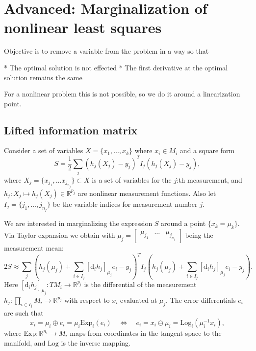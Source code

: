 
\chapter{Advanced: Marginalization of nonlinear least squares}

Objective is to remove a variable from the problem in a way so that


* The optimal solution is not effected
* The first derivative at the optimal solution remains the same

For a nonlinear problem this is not possible, so we do it around a linearization point.

\section{Lifted information matrix}

Consider a set of variables $X = \{ x_1, \ldots, x_k \}$ where $x_i \in M_i$ and a square form
$$
  S = \frac{1}{2} \sum_j \left( h_j(X_j) - y_j \right)^T I_j \left( h_j(X_j) - y_j \right),
$$
where $X_j = \{ x_{j_1}, \ldots x_{j_{n_j}}\} \subset X$ is a set of variables for the $j$:th measurement, and $h_j : X_j \mapsto h_j(X_j) \in \mathbb{R}^{p_j}$ are nonlinear measurement functions. Also let $I_j = \{ j_1, \ldots, j_{n_j} \}$ be the variable indices for measurement number $j$.

We are interested in marginalizing the expression $S$ around a point $\{ x_k = \mu_k \}$. Via Taylor expansion we obtain with $\mu_j = \begin{bmatrix} \mu_{j_1} & \ldots & \mu_{j_{n_j}} \end{bmatrix}$ being the measurement mean:
$$
  2S \approx  \sum_j \left( h_j(\mu_j) + \sum_{i \in I_j} [\mathrm{d}_i h_j]_{\mu_j} e_i - y_j \right)^T I_j \left( h_j(\mu_j) + \sum_{i \in I_j} [\mathrm{d}_i h_j]_{\mu_j} e_i - y_j \right).
$$
Here $[\mathrm{d}_i h_j]_{\mu_j} : T M_i \rightarrow \mathbb{R}^{p_j}$ is the differential of the measurement $h_j: \prod_{i \in I_j} M_i \rightarrow \mathbb{R}^{p_j}$ with respect to $x_i$ evaluated at $\mu_j$. The error differentials $e_i$ are such that
$$
  x_i = \mu_i \oplus e_i = \mu_i \mathrm{Exp}_i(e_i) \quad \Longleftrightarrow \quad e_i = x_i \ominus \mu_i = \textrm{Log}_i (\mu_i^{-1} x_i),
$$
where $\mathrm{Exp} : \mathbb{R}^{n{_i}} \rightarrow M_i$ maps from coordinates in the tangent space to the manifold, and $\mathrm{Log}$ is the inverse mapping.


